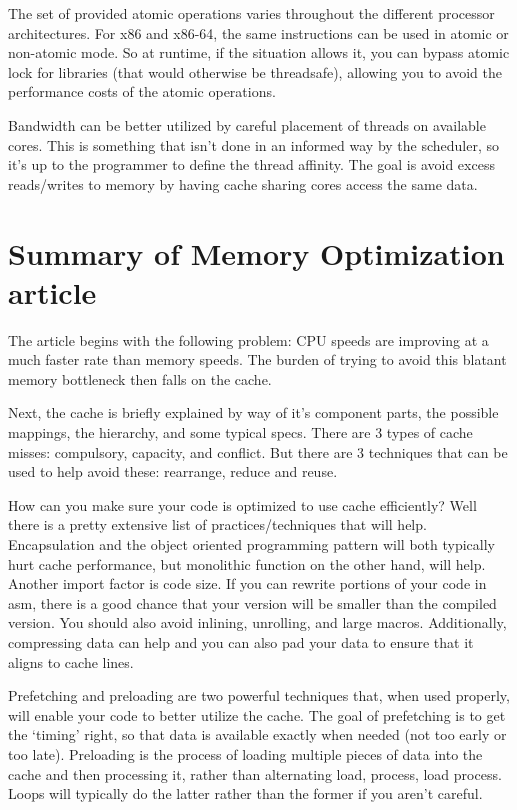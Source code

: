 \documentclass[letterpaper,12pt,titlepage]{article}
\begin{document}
The set of provided atomic operations varies throughout the different processor architectures. For x86 and x86-64, the same instructions can be used in atomic or non-atomic mode. So at runtime, if the situation allows it, you can bypass atomic lock for libraries (that would otherwise be threadsafe), allowing you to avoid the performance costs of the atomic operations.

Bandwidth can be better utilized by careful placement of threads on available cores. This is something that isn't done in an informed way by the scheduler, so it's up to the programmer to define the thread affinity. The goal is avoid excess reads/writes to memory by having cache sharing cores access the same data.

\section*{Summary of Memory Optimization article}

The article begins with the following problem: CPU speeds are improving at a much faster rate than memory speeds. The burden of trying to avoid this blatant memory bottleneck then falls on the cache.

Next, the cache is briefly explained by way of it's component parts, the possible mappings, the hierarchy, and some typical specs. There are 3 types of cache misses: compulsory, capacity, and conflict. But there are 3 techniques that can be used to help avoid these: rearrange, reduce and reuse.

How can you make sure your code is optimized to use cache efficiently? Well there is a pretty extensive list of practices/techniques that will help. Encapsulation and the object oriented programming pattern will both typically hurt cache performance, but monolithic function on the other hand, will help. Another import factor is code size. If you can rewrite portions of your code in asm, there is a good chance that your version will be smaller than the compiled version. You should also avoid inlining, unrolling, and large macros. Additionally, compressing data can help and you can also pad your data to ensure that it aligns to cache lines.

Prefetching and preloading are two powerful techniques that, when used properly, will enable your code to better utilize the cache. The goal of prefetching is to get the `timing' right, so that data is available exactly when needed (not too early or too late). Preloading is the process of loading multiple pieces of data into the cache and then processing it, rather than alternating load, process, load process. Loops will typically do the latter rather than the former if you aren't careful.
\end{document}
